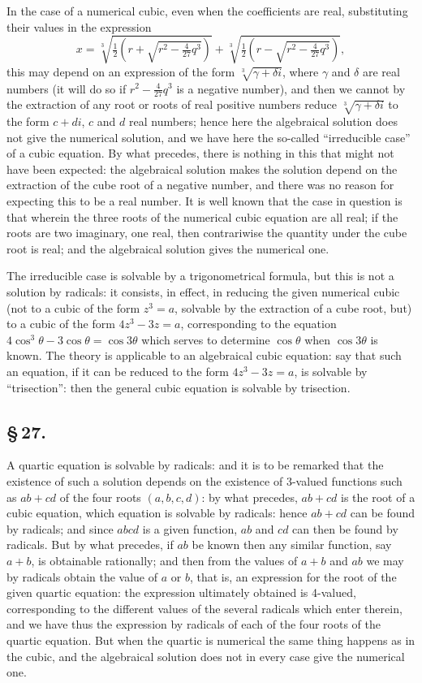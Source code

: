 \documentclass[11pt,a4paper]{book}
\begin{document}
In the case of a numerical cubic, even when the coefficients are real, substituting their values in the expression
\[
x = \sqrt[3]{\tfrac{1}{2}(r + \sqrt{r^{2} - \tfrac{4}{27}q^{3}})} + \sqrt[3]{\tfrac{1}{2}(r - \sqrt{r^{2} - \tfrac{4}{27}q^{3}})},
\]
this may depend on an expression of the form $\sqrt[3]{\gamma + \delta i}$, where $\gamma$ and $\delta$ are real numbers (it will do so if $r^{2} - \frac{4}{27}q^{3}$ is a negative number), and then we cannot by the extraction of any root or roots of real positive numbers reduce $\sqrt[3]{\gamma + \delta i}$ to the form $c + di$, $c$ and $d$ real numbers; hence here the algebraical solution does not give the numerical solution, and we have here the so-called ``irreducible case'' of a cubic equation. By what precedes, there is nothing in this that might not have been expected: the algebraical solution makes the solution depend on the extraction of the cube root of a negative number, and there was no reason for expecting this to be a real number. It is well known that the case in question is that wherein the three roots of the numerical cubic equation are all real; if the roots are two imaginary, one real, then contrariwise the quantity under the cube root is real; and the algebraical solution gives the numerical one.

The irreducible case is solvable by a trigonometrical formula, but this is not a solution by radicals: it consists, in effect, in reducing the given numerical cubic (not to a cubic of the form $z^{3} = a$, solvable by the extraction of a cube root, but) to a cubic of the form $4z^{3} - 3z = a$, corresponding to the equation $4\cos^{3}\theta - 3\cos\theta = \cos 3\theta$ which serves to determine $\cos\theta$ when $\cos 3\theta$ is known. The theory is applicable to an algebraical cubic equation: say that such an equation, if it can be reduced to the form $4z^{3} - 3z = a$, is solvable by ``trisection'': then the general cubic equation is solvable by trisection.

\subsection*{\S\,27.}

A quartic equation is solvable by radicals: and it is to be remarked that the existence of such a solution depends on the existence of 3-valued functions such as $ab + cd$ of the four roots $(a, b, c, d)$: by what precedes, $ab + cd$ is the root of a cubic equation, which equation is solvable by radicals: hence $ab + cd$ can be found by radicals; and since $abcd$ is a given function, $ab$ and $cd$ can then be found by radicals. But by what precedes, if $ab$ be known then any similar function, say $a + b$, is obtainable rationally; and then from the values of $a + b$ and $ab$ we may by radicals obtain the value of $a$ or $b$, that is, an expression for the root of the given quartic equation: the expression ultimately obtained is 4-valued, corresponding to the different values of the several radicals which enter therein, and we have thus the expression by radicals of each of the four roots of the quartic equation. But when the quartic is numerical the same thing happens as in the cubic, and the algebraical solution does not in every case give the numerical one.
\end{document}
